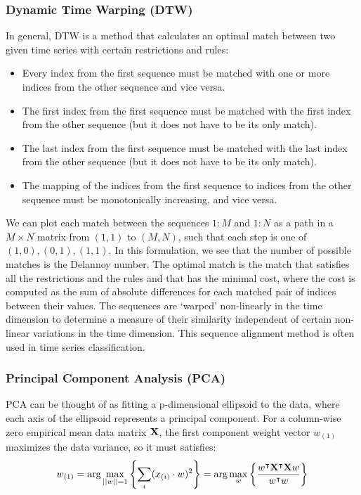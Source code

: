 \documentclass[a4paper,fleqn]{cas-sc}
\begin{document}
\subsubsection{Dynamic Time Warping (DTW)}\label{DTW}
In general, DTW is a method that calculates an optimal match between two given time series with certain restrictions and rules: 
\begin{itemize}
\item{Every index from the first sequence must be matched with one or more indices from the other sequence and vice versa.}
\item{The first index from the first sequence must be matched with the first index from the other sequence (but it does not have to be its only match).}
\item{The last index from the first sequence must be matched with the last index from the other sequence (but it does not have to be its only match).}
\item{The mapping of the indices from the first sequence to indices from the other sequence must be monotonically increasing, and vice versa.} 
\end{itemize}

We can plot each match between the sequences $1:M$ and $1:N$ as a path in a $M\times N$ matrix from $(1,1)$ to $(M, N)$, such that each step is one of $(1,0),(0,1),(1,1)$. In this formulation, we see that the number of possible matches is the Delannoy number. The optimal match is the match that satisfies all the restrictions and the rules and that has the minimal cost, where the cost is computed as the sum of absolute differences for each matched pair of indices between their values. The sequences are `warped' non-linearly in the time dimension to determine a measure of their similarity independent of certain non-linear variations in the time dimension. This sequence alignment method is often used in time series classification. 

\subsubsection{Principal Component Analysis (PCA)}\label{PCA}
PCA can be thought of as fitting a p-dimensional ellipsoid to the data, where each axis of the ellipsoid represents a principal component. For a column-wise zero empirical mean data matrix $\bold{X}$, the first component weight vector $w_{(1)}$ maximizes the data variance, so it must satisfies:
\begin{equation}
    w_{(1)}=\text{arg}\max_{||w||=1}\left\{ \sum_{i}(x_{(i)}\cdot w)^2\right\}=\text{arg}\max_{w}\left\{ \frac{w^\intercal\bold{X}^\intercal\bold{X} w}{w^\intercal w}\right\}
\end{equation}
\end{document}
